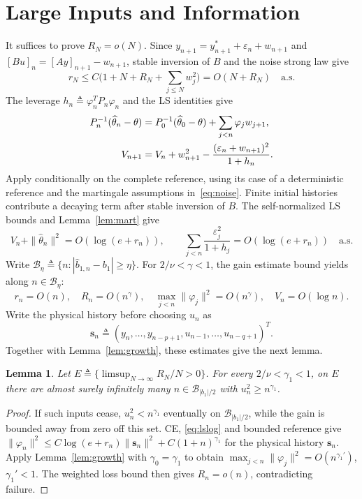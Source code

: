 \documentclass[11pt,reqno]{amsart}
\numberwithin{equation}{section}
\newtheorem{lemma}[theorem]{Lemma}
\theoremstyle{definition}
\theoremstyle{remark}
\newcommand{\thh}{\widehat\theta}
\newcommand{\ph}{\varphi}
\begin{document}
\section{Large Inputs and Information}\label{sec:global}
It suffices to prove $R_N=o(N)$. Since
$y_{n+1}=y_{n+1}^*+\varepsilon_n+w_{n+1}$ and $[Bu]_n=[Ay]_{n+1}-w_{n+1}$,
stable inversion of $B$ and the noise strong law give
\begin{equation*}
 r_N\le C\bigl(1+N+R_N+\sum_{j\le N}w_j^2\bigr)
       =O(N+R_N)\quad\text{a.s.}
\end{equation*}
The leverage $h_n\triangleq\ph_n^TP_n\ph_n$ and the LS identities give
\begin{align}
 P_n^{-1}(\thh_n-\theta)&=P_0^{-1}(\thh_0-\theta)+\sum_{j<n}\ph_jw_{j+1},\notag\\
 V_{n+1}&=V_n+w_{n+1}^2-\frac{(\varepsilon_n+w_{n+1})^2}{1+h_n}.\label{eq:lsidentity}
\end{align}
Apply \cite{Guo95} conditionally on the complete reference, using its case of a deterministic reference and the martingale assumptions in~\eqref{eq:noise}. Finite initial histories contribute a decaying term after stable inversion of $B$. The self-normalized LS bounds and Lemma~\ref{lem:mart} give
\begin{equation}\label{eq:lslog}
 V_n+\|\thh_n\|^2=O(\log(e+r_n)),\qquad
 \sum_{j<n}\frac{\varepsilon_j^2}{1+h_j}=O(\log(e+r_n))\quad\text{a.s.}
\end{equation}
Write $\mathcal B_\eta\triangleq\{n:|\widehat b_{1,n}-b_1|\ge\eta\}$. For $2/\nu<\gamma<1$, the gain estimate bound \cite[Lemma 7.1]{Guo95} yields along $n\in\mathcal B_\eta$:
\begin{equation}\label{eq:exception}
 r_n=O(n),\quad R_n=O(n^\gamma),\quad\max_{j<n}\|\ph_j\|^2=O(n^\gamma),\quad V_n=O(\log n).
\end{equation}
Write the physical history before choosing $u_n$ as
\[
 \mathbf s_n\triangleq(y_n,\ldots,y_{n-p+1},u_{n-1},\ldots,u_{n-q+1})^T.
\]
Together with Lemma~\ref{lem:growth}, these estimates give the next lemma.
\begin{lemma}\label{lem:bursts}
Let $E\triangleq\{\limsup_{N\to\infty}R_N/N>0\}$. For every $2/\nu<\gamma_1<1$, on $E$ there are almost surely infinitely many $n\in\mathcal B_{|b_1|/2}$ with $u_n^2\ge n^{\gamma_1}$.
\end{lemma}
\begin{proof}
If such inputs cease, $u_n^2<n^{\gamma_1}$ eventually on $\mathcal B_{|b_1|/2}$, while the gain is bounded away from zero off this set. CE, \eqref{eq:lslog} and bounded reference give
$\|\ph_n\|^2\le C\log(e+r_n)\|\mathbf s_n\|^2+C(1+n)^{\gamma_1}$ for the physical history $\mathbf s_n$. Apply Lemma~\ref{lem:growth} with $\gamma_0=\gamma_1$ to obtain $\max_{j<n}\|\ph_j\|^2=O(n^{\gamma_1'})$, $\gamma_1'<1$. The weighted loss bound then gives $R_n=o(n)$, contradicting failure.
\end{proof}
\end{document}
